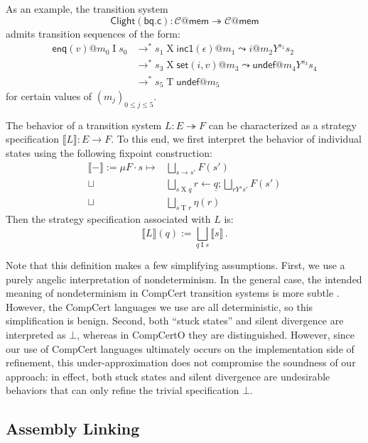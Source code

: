 \documentclass[sigplan,10pt,review,anonymous]{acmart}
\newcommand{\kw}[1]{\ensuremath{ \mathsf{#1} }}
\begin{document}
\noindent
As an example,
the transition system
\[
 \kw{Clight}(\kw{bq.c}) :
 \mathcal{C}@\kw{mem} \twoheadrightarrow \mathcal{C}@\kw{mem}
\]
admits transition sequences of the form:
{ \small
\begin{align*}
  \kw{enq}(v)@m_0 \mathrel{I}
  s_0 &\rightarrow^*
  s_1 \mathrel{X}
  \kw{inc1}(\epsilon)@m_1 \leadsto
  i@m_2 \mathrel{Y^{s_1}}
  s_2 \\&\rightarrow^*
  s_3 \mathrel{X}
  \kw{set}(i, v)@m_3 \leadsto
  \kw{undef}@m_4 \mathrel{Y^{s_3}}
  s_4 \\&\rightarrow^*
  s_5 \mathrel{T}
  \kw{undef}@m_5
\end{align*}}
for certain values of $(m_j)_{0 \le j \le 5}$.

The behavior of a transition system
$L : E \twoheadrightarrow F$
can be characterized as a strategy specification
$\llbracket L \rrbracket : E \rightarrow F$.
To this end,
we first interpret the behavior of individual states
using the following fixpoint construction:
\begin{align*}
  \llbracket - \rrbracket :=
  \mu F \cdot s \mapsto
  &\bigsqcup_{s \rightarrow s'} F(s') \\ \sqcup \:
  &\bigsqcup_{s \mathrel{X} q}
    r \mathbin\leftarrow \underline{q} \mathbin;
    \bigsqcup_{r \mathrel{Y^s} s'} F(s') \\ \sqcup \:
  &\bigsqcup_{s \mathrel{T} r} \eta(r)
\end{align*}
Then the strategy specification associated with $L$ is:
\[
  \llbracket L \rrbracket(q) :=
    \bigsqcup_{q \mathrel{I} s} \llbracket s \rrbracket
    \,.
\]

Note that this definition makes a few simplifying assumptions.
First,
we use a purely angelic interpretation of nondeterminism.
In the general case,
the intended meaning of nondeterminism in CompCert transition systems
is more subtle \cite[\S8.1]{thesis}.
However,
the CompCert languages we use are all deterministic,
so this simplification is benign.
Second,
both ``stuck states'' and silent divergence
are interpreted as $\bot$,
whereas in CompCertO they are distinguished.
However,
since our use of CompCert languages
ultimately occurs on the implementation side of refinement,
this under-approximation does not compromise
the soundness of our approach:
in effect,
both stuck states and silent divergence
are undesirable behaviors that can 
only refine the trivial specification $\bot$.

\subsection{Assembly Linking}
\end{document}
